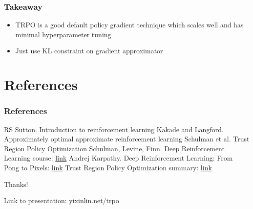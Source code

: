 \documentclass{beamer}
\begin{document}
\begin{frame}
  \frametitle{Takeaway}
  \begin{itemize}
    \item TRPO is a good default policy gradient technique which scales well and has minimal hyperparameter tuning
    \item Just use KL constraint on gradient approximator
  \end{itemize}
\end{frame}



\section{References}

\begin{frame}
  \frametitle{References}
  \footnotesize{
    \begin{thebibliography}{99} %
      \bibitem[]{} RS Sutton. Introduction to reinforcement learning
      \bibitem[]{} Kakade and Langford. Approximately optimal approximate reinforcement learning
      \bibitem[]{} Schulman et al. Trust Region Policy Optimization
      \bibitem[]{} Schulman, Levine, Finn. Deep Reinforcement Learning course: \href{http://rll.berkeley.edu/deeprlcourse/}{link}
      \bibitem[]{} Andrej Karpathy. Deep Reinforcement Learning: From Pong to Pixels: \href{http://karpathy.github.io/2016/05/31/rl/}{link}
      \bibitem[]{} Trust Region Policy Optimization summary: \href{https://jmk.pe.kr/media/attachments/5bcf0aca45da310a434bbc093799c85e/trpo.pdf}{link}
  \end{thebibliography}
}
\end{frame}


\begin{frame}
  \Huge{\centerline{Thanks!}}
  
  Link to presentation: yixinlin.net/trpo
\end{frame}

\end{document}
